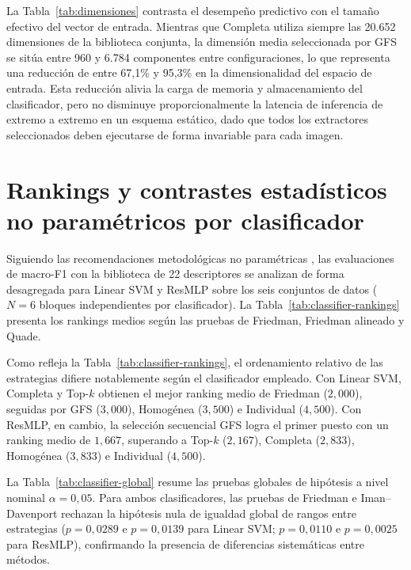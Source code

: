La Tabla~\ref{tab:dimensiones} contrasta el desempeño predictivo con el tamaño efectivo del vector de entrada. Mientras que Completa utiliza siempre las 20.652 dimensiones de la biblioteca conjunta, la dimensión media seleccionada por GFS se sitúa entre 960 y 6.784 componentes entre configuraciones, lo que representa una reducción de entre 67{,}1\% y 95{,}3\% en la dimensionalidad del espacio de entrada. Esta reducción alivia la carga de memoria y almacenamiento del clasificador, pero no disminuye proporcionalmente la latencia de inferencia de extremo a extremo en un esquema estático, dado que todos los extractores seleccionados deben ejecutarse de forma invariable para cada imagen.

\section{Rankings y contrastes estadísticos no paramétricos por clasificador}\label{sec:rankings-clasificador}

Siguiendo las recomendaciones metodológicas no paramétricas \citep{demsar2006statistical,derrac2011practical}, las evaluaciones de macro-F1 con la biblioteca de 22 descriptores se analizan de forma desagregada para Linear SVM y ResMLP sobre los seis conjuntos de datos ($N=6$ bloques independientes por clasificador). La Tabla~\ref{tab:classifier-rankings} presenta los rankings medios según las pruebas de Friedman, Friedman alineado y Quade.





Como refleja la Tabla~\ref{tab:classifier-rankings}, el ordenamiento relativo de las estrategias difiere notablemente según el clasificador empleado. Con Linear SVM, Completa y Top-$k$ obtienen el mejor ranking medio de Friedman ($2{,}000$), seguidas por GFS ($3{,}000$), Homogénea ($3{,}500$) e Individual ($4{,}500$). Con ResMLP, en cambio, la selección secuencial GFS logra el primer puesto con un ranking medio de $1{,}667$, superando a Top-$k$ ($2{,}167$), Completa ($2{,}833$), Homogénea ($3{,}833$) e Individual ($4{,}500$).

La Tabla~\ref{tab:classifier-global} resume las pruebas globales de hipótesis a nivel nominal $\alpha=0{,}05$. Para ambos clasificadores, las pruebas de Friedman e Iman--Davenport rechazan la hipótesis nula de igualdad global de rangos entre estrategias ($p=0{,}0289$ e $p=0{,}0139$ para Linear SVM; $p=0{,}0110$ e $p=0{,}0025$ para ResMLP), confirmando la presencia de diferencias sistemáticas entre métodos.

